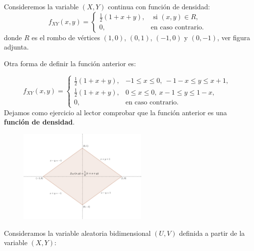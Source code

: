 \documentclass[]{book}
\begin{document}
Consideremos la variable \((X,Y)\) continua con función de densidad:
\[
f_{XY}(x,y)=\begin{cases}
\frac{1}{2}(1+x+y), & \mbox{ si }(x,y)\in R, \\
0, & \mbox{en caso contrario.}
\end{cases}
\]
donde \(R\) es el rombo de vértices \((1,0)\), \((0,1)\), \((-1,0)\) y \((0,-1)\), ver figura adjunta.

Otra forma de definir la función anterior es:

\[
f_{XY}(x,y)=\begin{cases}
\frac{1}{2}(1+x+y), & -1\leq x\leq 0,\ -1-x\leq y\leq x+1, \\
\frac{1}{2}(1+x+y), & 0\leq x\leq 0,\ x-1\leq y\leq 1-x, \\
0, & \mbox{en caso contrario.}
\end{cases}
\]
Dejamos como ejercicio al lector comprobar que la función anterior es una \textbf{función de densidad}.

\begin{figure}
\includegraphics[width=2.5in]{Images/EjTranLineal} \end{figure}

Consideramos la variable aleatoria bidimensional \((U,V)\) definida a partir de la variable \((X,Y)\):
\end{document}

